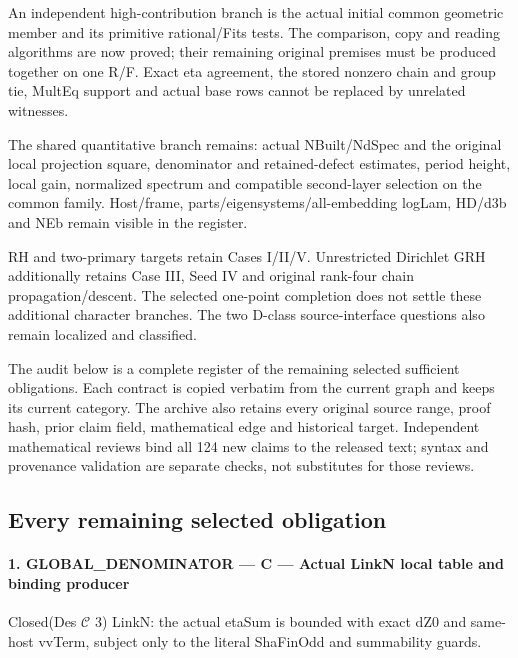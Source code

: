 An independent high-contribution branch is the actual initial common geometric member and its primitive rational/\allowbreak{}Fits tests. The comparison, copy and reading algorithms are now proved; their remaining original premises must be produced together on one R/\allowbreak{}F. Exact eta agreement, the stored nonzero chain and group tie, MultEq support and actual base rows cannot be replaced by unrelated witnesses.

The shared quantitative branch remains: actual NBuilt/\allowbreak{}NdSpec and the original local projection square, denominator and retained-defect estimates, period height, local gain, normalized spectrum and compatible second-layer selection on the common family. Host/\allowbreak{}frame, parts/\allowbreak{}eigensystems/\allowbreak{}all-embedding logLam, HD/\allowbreak{}d3b and NEb remain visible in the register.

RH and two-primary targets retain Cases I/\allowbreak{}II/\allowbreak{}V. Unrestricted Dirichlet GRH additionally retains Case III, Seed IV and original rank-four chain propagation/\allowbreak{}descent. The selected one-point completion does not settle these additional character branches. The two D-class source-interface questions also remain localized and classified.

The audit below is a complete register of the remaining selected sufficient obligations. Each contract is copied verbatim from the current graph and keeps its current category. The archive also retains every original source range, proof hash, prior claim field, mathematical edge and historical target. Independent mathematical reviews bind all 124 new claims to the released text; syntax and provenance validation are separate checks, not substitutes for those reviews.

\subsection{Every remaining selected obligation}

\paragraph{1. GLOBAL\_\allowbreak{}DENOMINATOR — C — Actual LinkN local table and binding producer}

Closed(Des $\mathcal C$ 3) LinkN: the actual etaSum is bounded with exact dZ0 and same-host vvTerm, subject only to the literal ShaFinOdd and summability guards.

